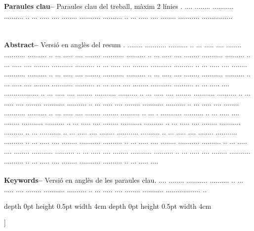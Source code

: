 ﻿\documentclass[10pt,a4paper,twocolumn,twoside]{article}
\begin{document}
\begin{@twocolumnfalse}
\begin{center}
{\textbf{Paraules clau-- } Paraules clau del treball, màxim 2 línies . .... ........ ........... .......... ..  ... ..... .... ........ ........... .......... ..  ... ..... .... ........ ........... ................\\
\\
\bigskip
\\
\textbf{Abstract--} Versió en anglès del resum . ........ ........... .......... ..  ... ..... .... ........ ........... .......... ..  ... ..... .... ........ ........... .......... ..  ... ..... .... ........ ........... .......... ..  ... ..... .... ........ ........... .......... ..  ... ..... .... ........ ........... .......... ..  ... ..... .... ........ ........... .......... ..  ... ..... .... ........ ........... .......... ..  ... ..... .... ........ ........... .......... ..  ... ..... .... ........ ........... .......... ..  ... ..... .... ........ ........... .......... ..  ... ..... .... .................. ..  ... ..... .... ........ ........... .......... ..  ... ..... .... ........ ........... .......... ..  ... ..... .... ........ ........... .......... ..  ... ..... .... ........ ........... .......... ..  ... ..... .... ........ ........... .......... ..  ... ..... .... ........ ........ .......... ..  ... . ........... .......... ..  ... ..... .... ........ ........... .......... ..  ... ..... .... ........ ........... .......... ..  ... ..... .... ........ ........... .......... ..  ... ........... ..  ... ..... .... ........ ........... .......... ..  ... ..... .... ........ ........... .......... ..  ... ..... .... ........ ........... .......... ..  ... ..... .... ........ ........... .......... ..  ... ..... .... ........ ........... .......... ..  ... ..... .... ........ ........... .......... ..  ... ..... .... ........ ........... .......... ..  ... ..... .... ........ ........... .......... ..  ... ..... ....
\\
\\
\textbf{Keywords-- } Versió en anglès de les paraules clau. .... ........ ........... .......... ..  ... ..... .... ........ ........... .......... ..  ... ..... .... ........ ........... .................. ..\\
}

\bigskip

{\vrule depth 0pt height 0.5pt width 4cm\hspace{7.5pt}%
%
\hspace{7.5pt}\vrule depth 0pt height 0.5pt width 4cm\relax}

\end{center}

\bigskip
\end{@twocolumnfalse}]
\end{document}
